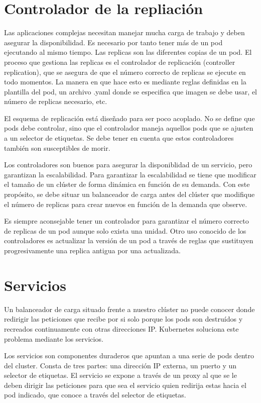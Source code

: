 \documentclass[11pt,a4paper]{article}
\begin{document}
\section{Controlador de la repliación}

Las aplicaciones complejas necesitan manejar mucha carga de trabajo y deben asegurar la disponibilidad. Es necesario por tanto tener más de un pod ejecutando al mismo tiempo. Las replicas son las diferentes copias de un pod. El proceso que gestiona las replicas es el controlador de replicación (controller replication), que se asegura de que el número correcto de replicas se ejecute en todo momentos. La manera en que hace esto es mediante reglas definidas en la plantilla del pod, un archivo .yaml donde se especifica que imagen se debe usar, el número de replicas necesario, etc.

El esquema de replicación está diseñado para ser poco acoplado. No se define que pods debe controlar, sino que el controlador maneja aquellos pods que se ajusten a un selector de etiquetas. Se debe tener en cuenta que estos controladores también son susceptibles de morir.

Los controladores son buenos para asegurar la disponiblidad de un servicio, pero garantizan la escalabilidad. Para garantizar la escalabilidad se tiene que modificar el tamaño de un clúster de forma dinámica en función de su demanda. Con este propósito, se debe situar un balanceador de carga antes del clúster que modifique el número de replicas para crear nuevos en función de la demanda que observe.

Es siempre aconsejable tener un controlador para garantizar el número correcto de replicas de un pod aunque solo exista una unidad. Otro uso conocido de los controladores es actualizar la versión de un pod a través de reglas que sustituyen progresivamente una replica antigua por una actualizada.

\section{Servicios}

Un balanceador de carga situado frente a nuestro clúster no puede conocer donde redirigir las peticiones que recibe por si solo porque los pods son destruídos y recreados continuamente con otras direcciones IP. Kubernetes soluciona este problema mediante los servicios.

Los servicios son componentes duraderos que apuntan a una serie de pods dentro del cluster. Consta de tres partes: una dirección IP externa, un puerto y un selector de etiquetas. El servicio se expone a través de un proxy al que se le deben dirigir las peticiones para que sea el servicio quien redirija estas hacia el pod indicado, que conoce a través del selector de etiquetas.
\end{document}
